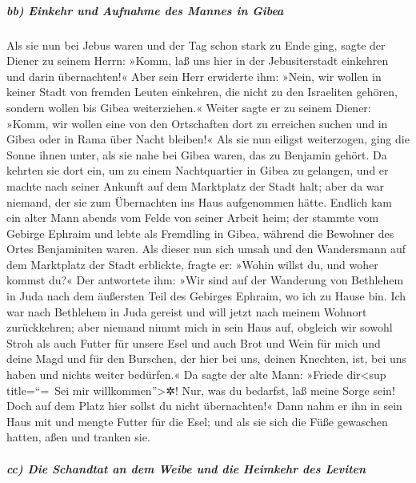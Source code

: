 \hypertarget{bb-einkehr-und-aufnahme-des-mannes-in-gibea}{%
\subparagraph{bb) Einkehr und Aufnahme des Mannes in
Gibea}\label{bb-einkehr-und-aufnahme-des-mannes-in-gibea}}

Als sie nun bei Jebus waren und der Tag schon stark zu
Ende ging, sagte der Diener zu seinem Herrn: »Komm, laß uns hier in der
Jebusiterstadt einkehren und darin übernachten!« Aber
sein Herr erwiderte ihm: »Nein, wir wollen in keiner Stadt von fremden
Leuten einkehren, die nicht zu den Israeliten gehören, sondern wollen
bis Gibea weiterziehen.« Weiter sagte er zu seinem
Diener: »Komm, wir wollen eine von den Ortschaften dort zu erreichen
suchen und in Gibea oder in Rama über Nacht bleiben!« Als
sie nun eiligst weiterzogen, ging die Sonne ihnen unter, als sie nahe
bei Gibea waren, das zu Benjamin gehört. Da kehrten sie
dort ein, um zu einem Nachtquartier in Gibea zu gelangen, und er machte
nach seiner Ankunft auf dem Marktplatz der Stadt halt; aber da war
niemand, der sie zum Übernachten ins Haus aufgenommen hätte.
Endlich kam ein alter Mann abends vom Felde von seiner
Arbeit heim; der stammte vom Gebirge Ephraim und lebte als Fremdling in
Gibea, während die Bewohner des Ortes Benjaminiten waren.
Als dieser nun sich umsah und den Wandersmann auf dem
Marktplatz der Stadt erblickte, fragte er: »Wohin willst du, und woher
kommst du?« Der antwortete ihm: »Wir sind auf der
Wanderung von Bethlehem in Juda nach dem äußersten Teil des Gebirges
Ephraim, wo ich zu Hause bin. Ich war nach Bethlehem in Juda gereist und
will jetzt nach meinem Wohnort zurückkehren; aber niemand nimmt mich in
sein Haus auf, obgleich wir sowohl Stroh als auch Futter
für unsere Esel und auch Brot und Wein für mich und deine Magd und für
den Burschen, der hier bei uns, deinen Knechten, ist, bei uns haben und
nichts weiter bedürfen.« Da sagte der alte Mann: »Friede
dir\textless sup title=``=~Sei mir willkommen''\textgreater✲! Nur, was
du bedarfst, laß meine Sorge sein! Doch auf dem Platz hier sollst du
nicht übernachten!« Dann nahm er ihn in sein Haus mit und
mengte Futter für die Esel; und als sie sich die Füße gewaschen hatten,
aßen und tranken sie.

\hypertarget{cc-die-schandtat-an-dem-weibe-und-die-heimkehr-des-leviten}{%
\subparagraph{cc) Die Schandtat an dem Weibe und die Heimkehr des
Leviten}\label{cc-die-schandtat-an-dem-weibe-und-die-heimkehr-des-leviten}}

